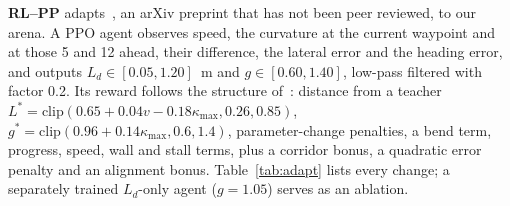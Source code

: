 \documentclass{IJCAS}
\begin{document}
\textbf{RL--PP} adapts~\cite{elgouhary2026}, an arXiv preprint that has not been peer reviewed, to our arena. A PPO agent observes speed, the curvature at the current waypoint and at those 5 and 12 ahead, their difference, the lateral error and the heading error, and outputs $L_d\in[0.05,1.20]$~m and $g\in[0.60,1.40]$, low-pass filtered with factor 0.2. Its reward follows the structure of~\cite{elgouhary2026}: distance from a teacher $L^{*}=\mathrm{clip}(0.65+0.04v-0.18\kappa_{\max},0.26,0.85)$, $g^{*}=\mathrm{clip}(0.96+0.14\kappa_{\max},0.6,1.4)$, parameter-change penalties, a bend term, progress, speed, wall and stall terms, plus a corridor bonus, a quadratic error penalty and an alignment bonus. Table~\ref{tab:adapt} lists every change; a separately trained $L_d$-only agent ($g=1.05$) serves as an ablation.

\begin{table}[t]
\caption{RL-tuned PP: original~\cite{elgouhary2026} and our adaptation.}\label{tab:adapt}
\centering
{}
\end{table}
\end{document}
